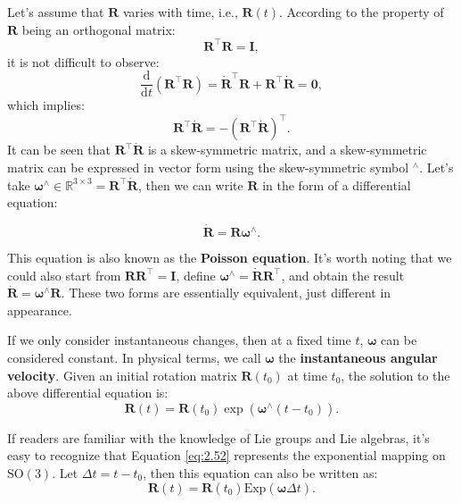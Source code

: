 Let's assume that $\mathbf{R}$ varies with time, i.e., $\mathbf{R}(t)$. According to the property of $\mathbf{R}$ being an orthogonal matrix:
\begin{equation}\label{key}
	\mathbf{R}^\top \mathbf{R} = \mathbf{I},
\end{equation}
it is not difficult to observe:
\begin{equation}
	\frac{\mathrm{d}}{{\mathrm{d}t}}\left( {{\mathbf{R}^\top} \mathbf{R}} \right) = {\dot{\mathbf{R}}^\top} \mathbf{R} 
	+ {\mathbf{R}^\top}\dot{\mathbf{R}} = \mathbf{0},
\end{equation}
which implies:
\begin{equation}
	{\mathbf{R}^\top}\dot{\mathbf{R}} = -({\mathbf{R}^\top}\dot{\mathbf{R}})^\top.
\end{equation}
It can be seen that ${\mathbf{R}^\top}\dot{\mathbf{R}}$ is a skew-symmetric matrix, and a skew-symmetric matrix can be expressed in vector form using the skew-symmetric symbol $^\wedge$. Let's take $\boldsymbol{\omega}^\wedge \in \mathbb{R}^{3 \times 3} = 
{\mathbf{R}^\top}\dot{\mathbf{R}}$, then we can write $\mathbf{R}$ in the form of a differential equation:

\begin{equation}\label{eq:2.51}
	\dot{\mathbf{R}} = \mathbf{R} \boldsymbol{\omega}^\wedge.
\end{equation}

This equation is also known as the \textbf{Poisson equation}\cite{Rauch1965}. It's worth noting that we could also start from $\mathbf{R} \mathbf{R}^\top = \mathbf{I}$, define $\boldsymbol{\omega}^\wedge = \dot{\mathbf{R}} \mathbf{R}^\top$, and obtain the result $\dot{\mathbf{R}} = \boldsymbol{\omega}^\wedge\mathbf{R}$. These two forms are essentially equivalent, just different in appearance.

If we only consider instantaneous changes, then at a fixed time $t$, $\boldsymbol{\omega}$ can be considered constant. In physical terms, we call $\boldsymbol{\omega}$ the \textbf{instantaneous angular velocity}. Given an initial rotation matrix $\mathbf{R}(t_0)$ at time $t_0$, the solution to the above differential equation is:
\begin{equation}\label{eq:2.52}
	\mathbf{R}(t) = \mathbf{R}(t_0) \exp(\boldsymbol{\omega}^\wedge (t-t_0)).
\end{equation}

If readers are familiar with the knowledge of Lie groups and Lie algebras, it's easy to recognize that Equation \eqref{eq:2.52} represents the exponential mapping on $\mathrm{SO}(3)$. Let $\Delta t = t - t_0$, then this equation can also be written as:
\begin{equation}\label{eq:2.53}
	\mathbf{R}(t) = \mathbf{R}(t_0) \mathrm{Exp}(\boldsymbol{\omega} \Delta t).
\end{equation}

